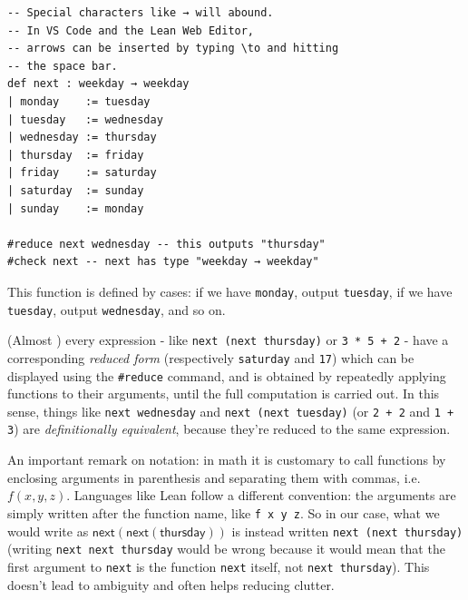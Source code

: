 \documentclass[oneside]{book}
\theoremstyle{definition}
\theoremstyle{remark}
\theoremstyle{plain}
\begin{document}
\begin{lstlisting}
-- Special characters like → will abound.
-- In VS Code and the Lean Web Editor,
-- arrows can be inserted by typing \to and hitting
-- the space bar. 
def next : weekday → weekday
| monday    := tuesday
| tuesday   := wednesday
| wednesday := thursday
| thursday  := friday
| friday    := saturday
| saturday  := sunday
| sunday    := monday

#reduce next wednesday -- this outputs "thursday"
#check next -- next has type "weekday → weekday"
\end{lstlisting}
This function is defined by cases:
if we have \lstinline{monday}, output \lstinline{tuesday},
if we have \lstinline{tuesday}, output \lstinline{wednesday}, and so on.

(Almost \cite{CarneiroMaster}) every expression - like \lstinline{next (next thursday)} or \lstinline{3 * 5 + 2} -
have a corresponding \textit{reduced form} (respectively \lstinline{saturday} and \lstinline{17})
which can be displayed using the \lstinline{#reduce} command,
and is obtained by repeatedly applying functions to their arguments, until the full computation is carried out.
In this sense, things like \lstinline{next wednesday} and \lstinline{next (next tuesday)}
(or \lstinline{2 + 2} and \lstinline{1 + 3}) are \textit{definitionally equivalent}, because they're reduced to the same expression.

An important remark on notation:
in math it is customary to call functions by enclosing arguments in parenthesis and separating them with commas, i.e. $f(x,y,z)$.
Languages like Lean follow a different convention: the arguments are simply written after the function name, like \lstinline{f x y z}.
So in our case, what we would write as $\mathsf{next(next(thursday))}$ is instead written \lstinline{next (next thursday)}
(writing \lstinline{next next thursday} would be wrong
because it would mean that the first argument to \lstinline{next} is the function \lstinline{next} itself, not \lstinline{next thursday}).
This doesn't lead to ambiguity and often helps reducing clutter.
\end{document}
